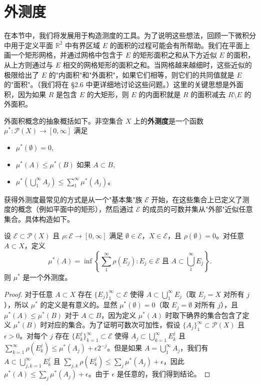 \documentclass[lang=cn,10pt,thmcnt=section]{elegantbook}
\begin{document}
\section{外测度}

在本节中，我们将发展用于构造测度的工具。为了说明这些想法，回顾一下微积分中用于定义平面 $\mathbb{R}^2$ 中有界区域 $E$ 的面积的过程可能会有所帮助。我们在平面上画一个矩形网格，并通过网格中包含于 $E$ 的矩形面积之和从下方近似 $E$ 的面积，从上方则通过与 $E$ 相交的网格矩形的面积之和。当网格越来越细时，这些近似的极限给出了 $E$ 的"内面积"和"外面积"，如果它们相等，则它们的共同值就是 $E$ 的"面积"。（我们将在 \S2.6 中更详细地讨论这些问题。）这里的关键思想是外面积，因为如果 $R$ 是包含 $E$ 的大矩形，则 $E$ 的内面积就是 $R$ 的面积减去 $R \setminus E$ 的外面积。

外面积概念的抽象概括如下。非空集合 $X$ 上的\textbf{外测度}是一个函数 $\mu^* : \mathcal{P}(X) \to [0, \infty]$ 满足

\begin{itemize}
\item $\mu^*(\emptyset) = 0$,
\item $\mu^*(A) \leq \mu^*(B)$ 如果 $A \subset B$,
\item $\mu^*(\bigcup_{1}^{\infty} A_j) \leq \sum_{1}^{\infty} \mu^*(A_j)$。
\end{itemize}

获得外测度最常见的方式是从一个"基本集"族 $\mathcal{E}$ 开始，在这些集合上已定义了测度的概念（例如平面中的矩形），然后通过 $\mathcal{E}$ 的成员的可数并集从"外部"近似任意集合。具体构造如下。

\begin{proposition}\label{proposition1.10}
设 $\mathcal{E} \subset \mathcal{P}(X)$ 且 $\rho : \mathcal{E} \to [0, \infty]$ 满足 $\emptyset \in \mathcal{E}$，$X \in \mathcal{E}$，且 $\rho(\emptyset) = 0$。对任意 $A \subset X$，定义
\[\mu^*(A) = \inf\left\{\sum_{1}^{\infty} \rho(E_j) : E_j \in \mathcal{E} \text{ 且 } A \subset \bigcup_{1}^{\infty} E_j\right\}.\]
则 $\mu^*$ 是一个外测度。
\end{proposition}

\begin{proof}
对于任意 $A \subset X$ 存在 $\{E_j\}_{1}^{\infty} \subset \mathcal{E}$ 使得 $A \subset \bigcup_{1}^{\infty} E_j$（取 $E_j = X$ 对所有 $j$），所以 $\mu^*$ 的定义是有意义的。显然 $\mu^*(\emptyset) = 0$（取 $E_j = \emptyset$ 对所有 $j$），且 $\mu^*(A) \leq \mu^*(B)$ 对于 $A \subset B$，因为定义 $\mu^*(A)$ 时取下确界的集合包含了定义 $\mu^*(B)$ 时对应的集合。为了证明可数次可加性，假设 $\{A_j\}_{1}^{\infty} \subset \mathcal{P}(X)$ 且 $\epsilon > 0$。对每个 $j$ 存在 $\{E_k^j\}_{k=1}^{\infty} \subset \mathcal{E}$ 使得 $A_j \subset \bigcup_{k=1}^{\infty} E_k^j$ 且 $\sum_{k=1}^{\infty} \rho(E_k^j) \leq \mu^*(A_j) + \epsilon2^{-j}$。但是如果 $A = \bigcup_{1}^{\infty} A_j$，我们有 $A \subset \bigcup_{j,k=1}^{\infty} E_k^j$ 且 $\sum_{j,k} \rho(E_k^j) \leq \sum_j \mu^*(A_j) + \epsilon$，因此 $\mu^*(A) \leq \sum_j \mu^*(A_j) + \epsilon$。由于 $\epsilon$ 是任意的，我们得到结论。
\end{proof}
\end{document}
